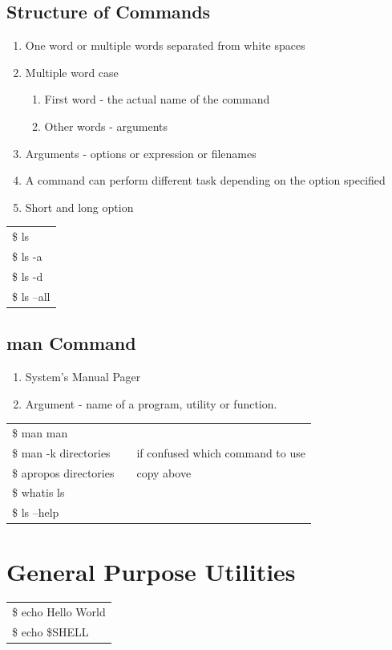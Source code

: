 \documentclass[12pt, a4paper]{report}
\begin{document}
\section{Structure of Commands}
\begin{enumerate}
\item One word or multiple words separated from white spaces
\item Multiple word case
\begin{enumerate}
\item First word - the actual name of the command
\item Other words - arguments
\end{enumerate}
\item Arguments - options or expression or filenames
\item A command can perform different task depending on the option specified
\item Short and long option
\end{enumerate}
\begin{tabular}{|l|}\hline
\$ ls\\
\$ ls -a\\
\$ ls -d\\
\$ ls --all
\\ \hline
\end{tabular}
\section{man Command}
\begin{enumerate}
\item System's Manual Pager
\item Argument - name of a program, utility or function.
\end{enumerate}
\begin{tabular}{|lcl|}\hline
\$ man man&&\\
\$ man -k directories && if confused which command to use\\
\$ apropos directories && copy above\\
\$ whatis ls&&\\
\$ ls --help&&\\ \hline
\end{tabular}
%
\chapter{General Purpose Utilities}
\begin{tabular}{|l|}\hline
\$ echo Hello World\\
\$ echo \$SHELL\\ \hline
\end{tabular}
\end{document}
